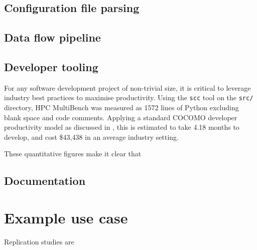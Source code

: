 \subsection{Configuration file parsing}
\label{sec:hpc-multibench-gui-design}

\subsection{Data flow pipeline}
\label{sec:hpc-multibench-gui-design}


\subsection{Developer tooling}
\label{sec:hpc-multibench-developer-tooling}

For any software development project of non-trivial size, it is critical to leverage industry best practices to maximise productivity. Using the \texttt{scc} \cite{} tool on the \texttt{src/} directory, HPC MultiBench was measured as 1572 lines of Python excluding blank space and code comments. Applying a standard COCOMO developer productivity model as discussed in , this is estimated to take 4.18 months to develop, and cost \$43,438 in an average industry setting.

These quantitative figures make it clear that 

\subsection{Documentation}
\label{sec:hpc-multibench-documentation}



\section{Example use case}
\label{sec:hpc-multibench-example-use-case} %


Replication studies are

